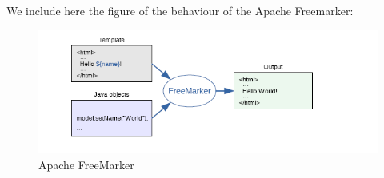 We include here the figure of the behaviour of the Apache Freemarker:
\begin{figure}[b]
\centering
\includegraphics{functional_role/Images/freemarker.png}
\caption{Apache FreeMarker}\label{fig:1}
\end{figure}


